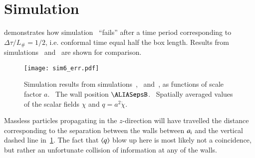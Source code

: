 




\newcommand\Ft{\ALIASFt}
\newcommand\ah{\ALIASah}
\newcommand\lcoord{\ALIASlcoord}
\newcommand\lcoordx{\ALIASlcoordx}
\newcommand\lcoordk{\ALIASlcoordk}
\newcommand\hpA{\ALIAShpA}
\newcommand\hpB{\ALIAShpB}
\newcommand\hpC{\ALIAShpC}
\newcommand\hpAB{\ALIAShpAB}
\newcommand\hpCR{\ALIAShpCR}
\newcommand\hpCI{\ALIAShpCI}
\newcommand\epsA{\ALIASepsA}
\newcommand\epsB{\ALIASepsB}
\newcommand\epsC{\ALIASepsC}







\section{Simulation~}\label{app:misc:sim6}
     demonstrates how simulation~ ``fails'' after a time period corresponding to $\Delta \tau/L_\#= 1/2$, i.e. conformal time equal half the box length. Results from simulations~ and~ are shown for comparison.
    \begin{figure}[h!]
        \centering
        \texttt{[image: sim6\_err.pdf]}
        \caption{Simulation results from simulations~,~ and~, as functions of scale factor $a$. ~The wall position $\epsB$. ~Spatially averaged values of the scalar fields $\chi$ and $q=a^2 \dot{\chi}$.}
        \label{fig:misc:sim6:sim6_err}
    \end{figure}%
    Massless particles propagating in the $z$-direction will have travelled the distance corresponding to the separation between the walls between $a_\mathrm{i}$ and the vertical dashed line in~\cref{fig:misc:sim6:sim6_err}. The fact that $\left\langle{q}\right\rangle$ blow up here is most likely not a coincidence, but rather an unfortunate collision of information at any of the walls.  




